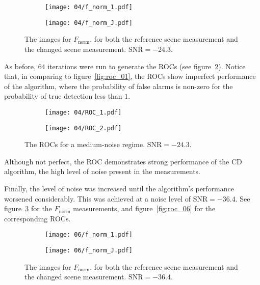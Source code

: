 \documentclass{article}
\begin{document}
\begin{figure}[H]
   \centering
   \begin{subfigure}{0.5\textwidth}
       \centering
       \texttt{[image: 04/f\_norm\_1.pdf]}
   \end{subfigure}%
   \begin{subfigure}{0.5\textwidth}
       \centering
       \texttt{[image: 04/f\_norm\_J.pdf]}
   \end{subfigure}%
   \caption{The images for $F_\text{norm}$, for both the reference scene measurement and the changed scene measurement. $\text{SNR} = -24.3$.}
   \label{fig:f_norm_med}
\end{figure}

As before, $64$ iterations were run to generate the ROCs (see figure~\ref{fig:roc_04}). Notice that, in comparing to figure~\ref{fig:roc_01}, the ROCs show imperfect performance of the algorithm, where the probability of false alarms is non-zero for the probability of true detection less than $1$.

\begin{figure}[H]
   \centering
   \begin{subfigure}{0.5\textwidth}
       \centering
       \texttt{[image: 04/ROC\_1.pdf]}
   \end{subfigure}%
   \begin{subfigure}{0.5\textwidth}
       \centering
       \texttt{[image: 04/ROC\_2.pdf]}
   \end{subfigure}%
   \caption{The ROCs for a medium-noise regime. $\text{SNR} = -24.3$.}
   \label{fig:roc_04}
\end{figure}

Although not perfect, the ROC demonstrates strong performance of the CD algorithm, the high level of noise present in the measurements.

Finally, the level of noise was increased until the algorithm's performance worsened considerably. This was achieved at a noise level of $\text{SNR}=-36.4$. See figure~\ref{fig:f_norm_high} for the $F_\text{norm}$ measurements, and figure~\ref{fig:roc_06} for the corresponding ROCs.

\begin{figure}[H]
   \centering
   \begin{subfigure}{0.5\textwidth}
       \centering
       \texttt{[image: 06/f\_norm\_1.pdf]}
   \end{subfigure}%
   \begin{subfigure}{0.5\textwidth}
       \centering
       \texttt{[image: 06/f\_norm\_J.pdf]}
   \end{subfigure}%
   \caption{The images for $F_\text{norm}$, for both the reference scene measurement and the changed scene measurement. $\text{SNR} = -36.4$.}
   \label{fig:f_norm_high}
\end{figure}
\end{document}

